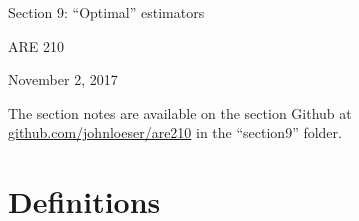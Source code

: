 \documentclass[12pt,english]{article}
\begin{document}
\begin{center}
{\Large{}Section 9: ``Optimal'' estimators}
\par\end{center}{\Large \par}

\begin{center}
ARE 210
\par\end{center}

\begin{center}
November 2, 2017
\par\end{center}

The section notes are available on the section Github at \href{github.com/johnloeser/are210}{github.com/johnloeser/are210} in the ``section9'' folder.

\section{Definitions}
\end{document}
